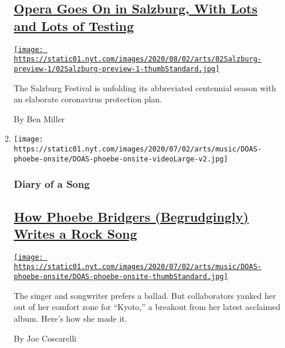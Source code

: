 \begin{enumerate}
\begin{enumerate}
    \hypertarget{opera-goes-on-in-salzburg-with-lots-and-lots-of-testing}{%
    \subsection{\texorpdfstring{\href{/2020/07/31/arts/music/salzburg-festival-coronavirus-cosi.html}{Opera
    Goes On in Salzburg, With Lots and Lots of
    Testing}}{Opera Goes On in Salzburg, With Lots and Lots of Testing}}\label{opera-goes-on-in-salzburg-with-lots-and-lots-of-testing}}

    \href{/2020/07/31/arts/music/salzburg-festival-coronavirus-cosi.html}{\texttt{[image: https://static01.nyt.com/images/2020/08/02/arts/02Salzburg-preview-1/02Salzburg-preview-1-thumbStandard.jpg]}}

    The Salzburg Festival is unfolding its abbreviated centennial season
    with an elaborate coronavirus protection plan.

    By Ben Miller
  \item
    \texttt{[image: https://static01.nyt.com/images/2020/07/02/arts/music/DOAS-phoebe-onsite/DOAS-phoebe-onsite-videoLarge-v2.jpg]}

    \hypertarget{diary-of-a-song}{%
    \subsubsection{Diary of a Song}\label{diary-of-a-song}}

    \hypertarget{how-phoebe-bridgers-begrudgingly-writes-a-rock-song}{%
    \subsection{\texorpdfstring{\href{/2020/07/30/arts/music/phoebe-bridgers-kyoto.html}{How
    Phoebe Bridgers (Begrudgingly) Writes a Rock
    Song}}{How Phoebe Bridgers (Begrudgingly) Writes a Rock Song}}\label{how-phoebe-bridgers-begrudgingly-writes-a-rock-song}}

    \href{/2020/07/30/arts/music/phoebe-bridgers-kyoto.html}{\texttt{[image: https://static01.nyt.com/images/2020/07/02/arts/music/DOAS-phoebe-onsite/DOAS-phoebe-onsite-thumbStandard.jpg]}}

    The singer and songwriter prefers a ballad. But collaborators yanked
    her out of her comfort zone for ``Kyoto,'' a breakout from her
    latest acclaimed album. Here's how she made it.

    By Joe Coscarelli
  \end{enumerate}
\end{enumerate}

